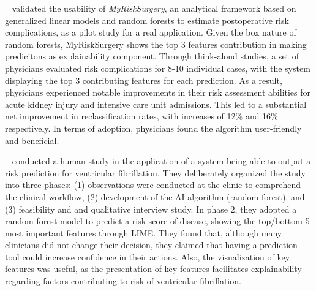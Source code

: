 ~\cite{brennan2019comparing} validated the usability of \textit{MyRiskSurgery}, an analytical framework based on generalized linear models and random forests to estimate postoperative risk complications, as a pilot study for a real application. Given the  box nature of random forests, MyRiskSurgery shows the top 3 features contribution in making predicitons as explainability component. 
Through think-aloud studies, a set of physicians evaluated risk complications for 8-10 individual cases, with the system displaying the top 3 contributing features for each prediction. As a result, physicians experienced notable improvements in their risk assessment abilities for acute kidney injury and intensive care unit admissions. This led to a substantial net improvement in reclassification rates, with increases of 12\% and 16\% respectively. In terms of adoption, physicians found the algorithm user-friendly and beneficial.



~\cite{matthiesen2021clinician} conducted a human study in the application of a system being able to output a risk prediction for ventricular fibrillation. They deliberately organized the study into three phases: (1) observations were conducted at the clinic to comprehend the clinical workflow, (2) development of the AI algorithm (random forest), and (3) feasibility and and qualitative interview study. In phase 2, they adopted a random forest model to predict a risk score of disease, showing the top/bottom 5 most important features through LIME. They found that, although many clinicians did not change their decision, they claimed that having a prediction tool could increase confidence in their actions. Also, the visualization of key features was useful, as the presentation of key features facilitates explainability regarding factors contributing to risk of ventricular fibrillation. 




